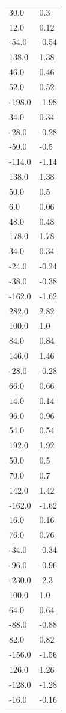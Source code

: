 \begin{longtable}{ll}
30.0 & 0.3 \\
12.0 & 0.12 \\
-54.0 & -0.54 \\
138.0 & 1.38 \\
46.0 & 0.46 \\
52.0 & 0.52 \\
-198.0 & -1.98 \\
34.0 & 0.34 \\
-28.0 & -0.28 \\
-50.0 & -0.5 \\
-114.0 & -1.14 \\
138.0 & 1.38 \\
50.0 & 0.5 \\
6.0 & 0.06 \\
48.0 & 0.48 \\
178.0 & 1.78 \\
34.0 & 0.34 \\
-24.0 & -0.24 \\
-38.0 & -0.38 \\
-162.0 & -1.62 \\
282.0 & 2.82 \\
100.0 & 1.0 \\
84.0 & 0.84 \\
146.0 & 1.46 \\
-28.0 & -0.28 \\
66.0 & 0.66 \\
14.0 & 0.14 \\
96.0 & 0.96 \\
54.0 & 0.54 \\
192.0 & 1.92 \\
50.0 & 0.5 \\
70.0 & 0.7 \\
142.0 & 1.42 \\
-162.0 & -1.62 \\
16.0 & 0.16 \\
76.0 & 0.76 \\
-34.0 & -0.34 \\
-96.0 & -0.96 \\
-230.0 & -2.3 \\
100.0 & 1.0 \\
64.0 & 0.64 \\
-88.0 & -0.88 \\
82.0 & 0.82 \\
-156.0 & -1.56 \\
126.0 & 1.26 \\
-128.0 & -1.28 \\
-16.0 & -0.16 \\

\end{longtable}

